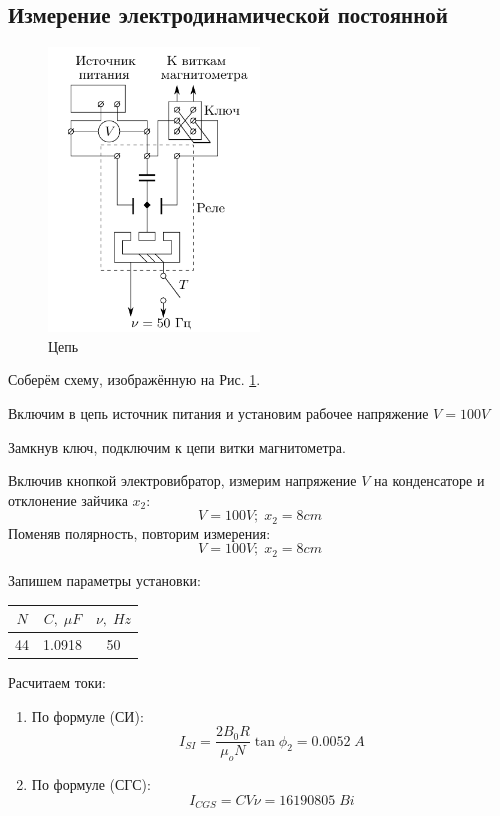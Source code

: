 \documentclass{article}
\begin{document}
\subsection{Измерение электродинамической постоянной}

\begin{figure}[h]
    \centering
    \includegraphics[width=0.5\textwidth]{circuit-scheme.png}
    \caption{Цепь}
    \label{fig:circuit}
\end{figure}

Соберём схему, изображённую на Рис. \ref{fig:circuit}.

Включим в цепь источник питания и установим рабочее напряжение \( V = 100V \)

Замкнув ключ, подключим к цепи витки магнитометра. 

Включив кнопкой электровибратор, измерим напряжение \(V\) на конденсаторе и отклонение зайчика \(x_2\):
\[ V = 100V;\; x_2 = 8cm \]
Поменяв полярность, повторим измерения:
\[ V = 100V;\; x_2 = 8cm \]

Запишем параметры установки:
\begin{table}[H]
    \centering
    \begin{tabular}{|c|c|c|}
        \hline
        \(N\) & \(C,\; \mu F\) & \(\nu,\; Hz \) \\\hline
        44    & 1.0918         & 50 \\\hline        
    \end{tabular}
\end{table}

Расчитаем токи:
\begin{enumerate}
    \item По формуле (СИ):
    \[ I_{SI} = \frac{2B_0R}{\mu_oN}\tan{\phi_2} = 0.0052\; A \]  
    \item По формуле (СГС):
    \[ I_{CGS} = CV\nu = 16190805\; Bi \]
\end{enumerate}
\end{document}
